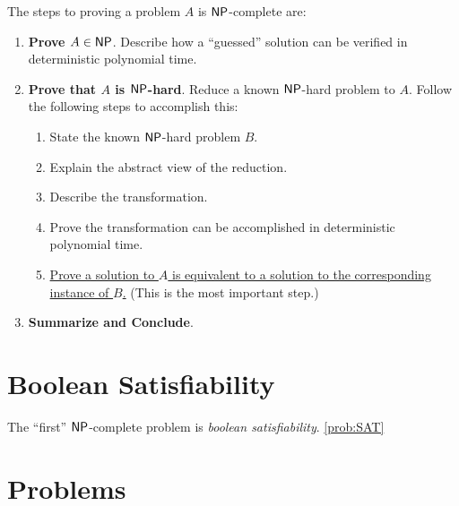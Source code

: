 The steps to proving a problem $A$ is $\textsf{NP}$-complete are:
\begin{enumerate}
	\item \textbf{Prove $A \in \textsf{NP}$}. Describe how a ``guessed'' solution can be verified in deterministic polynomial time.
	\item \textbf{Prove that $A$ is $\textsf{NP}$-hard}. Reduce a known $\textsf{NP}$-hard problem to $A$. Follow the following steps to accomplish this:
	\begin{enumerate}
		\item State the known $\textsf{NP}$-hard problem $B$.
		\item Explain the abstract view of the reduction.
		\item Describe the transformation.
		\item Prove the transformation can be accomplished in deterministic polynomial time.
		\item \underline{Prove a solution to $A$ is equivalent to a solution to the corresponding instance of $B$.} (This is the most important step.)
	\end{enumerate}
	\item \textbf{Summarize and Conclude}.
\end{enumerate}

\section{Boolean Satisfiability}

The ``first'' $\textsf{NP}$-complete problem is \emph{boolean satisfiability}.
\cref{prob:SAT}
\section{Problems}
